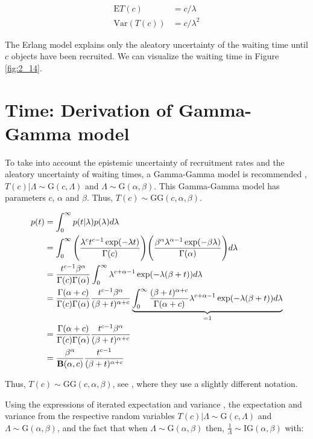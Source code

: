 \begin{align*}
\textrm{E}T(c) & = c/\lambda\\
\textrm{Var}(T(c)) & = c/\lambda^2
\end{align*}

The Erlang model explains only the aleatory uncertainty of the waiting time until $c$ objects have been recruited. We can visualize the waiting time in Figure \ref{fig:2_14}.

\section{Time: Derivation of Gamma-Gamma model}

To take into account the epistemic uncertainty of recruitment rates and the aleatory uncertainty of waiting times, a Gamma-Gamma model is recommended \citep{bagiella2001predicting}, $T(c)|\Lambda \sim \textrm{G}(c, \Lambda)$ and $\Lambda \sim \textrm{G}(\alpha,\beta)$. This Gamma-Gamma model has parameters $c$, $\alpha$ and $\beta$. Thus, $T(c)\sim \textrm{GG}(c, \alpha, \beta)$.


\begin{align*}
p(t) &= \int_0^{\infty} p(t|\lambda) p(\lambda) d\lambda\\
&= \int_0^{\infty}\Bigg( \frac{\lambda^ct^{c-1}\exp(-\lambda t)}{\Gamma(c)}\Bigg)\Bigg(\frac{\beta^{\alpha}\lambda^{\alpha-1}\exp(-\beta \lambda)}{\Gamma(\alpha)}\Bigg)d\lambda \\
&=\frac{t^{c-1}\beta^{\alpha}}{\Gamma(c)\Gamma(\alpha)}\int_0^{\infty}\lambda^{c+\alpha-1}\exp(-\lambda(\beta+t))d\lambda\\
&=\frac{\Gamma(\alpha+c)}{\Gamma(c)\Gamma(\alpha)}\frac{t^{c-1}\beta^{\alpha}}{(\beta+t)^{\alpha+c}}\underbrace{\int_0^{\infty}\frac{(\beta+t)^{\alpha+c}}{\Gamma(\alpha+c)}\lambda^{c+\alpha-1}\exp(-\lambda(\beta+t))d\lambda}_{=1}\\
&=\frac{\Gamma(\alpha+c)}{\Gamma(c)\Gamma(\alpha)}\frac{t^{c-1}\beta^{\alpha}}{(\beta+t)^{\alpha+c}}\\
&=\frac{\beta^{\alpha}}{{\mathbf{B}}(\alpha, c)}\frac{t^{c-1}}{(\beta+t)^{\alpha+c}}
\end{align*}

Thus, $T(c)\sim \textrm{GG} (c, \alpha, \beta)$, see \cite{held2014applied}, where they use a slightly different notation.

Using the expressions of iterated expectation and variance \citep{held2014applied}, the expectation and variance from the respective random variables $T(c)|\Lambda \sim \textrm{G}(c, \Lambda)$ and $\Lambda \sim \textrm{G}(\alpha,\beta)$, and the fact that when $\Lambda \sim \textrm{G}(\alpha, \beta)$ then, $\frac{1}{\Lambda} \sim \textrm{IG}(\alpha, \beta)$ with:


